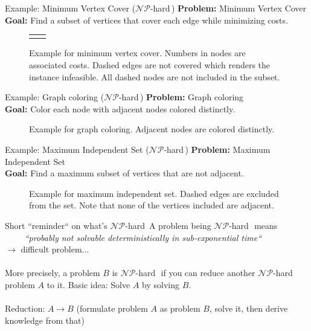 \documentclass[10pt]{beamer}
\newcommand{\primaryColorB}[1]{\textcolor{mpigreen}{\textbf{#1}}}
\newcommand{\q}[1]{``#1``}
\newcommand{\nphard}{$\mathcal{NP}$-hard\,}
\begin{document}
\begin{frame}{Example: Minimum Vertex Cover (\nphard)}
\primaryColorB{Problem:} Minimum Vertex Cover\\
\primaryColorB{Goal:} Find a subset of vertices that cover each edge while minimizing costs.\\

\begin{figure}
	\centering
\begin{tabular}{c c}
	\mvcSufficient
	\mvcInsufficient
\end{tabular}
	\caption{Example for minimum vertex cover. Numbers in nodes are associated costs. Dashed edges are not covered which renders the instance infeasible. All dashed nodes are not included in the subset.}
\end{figure}
\end{frame}


\begin{frame}{Example: Graph coloring (\nphard)}
\primaryColorB{Problem:} Graph coloring\\
\primaryColorB{Goal:} Color each node with adjacent nodes colored distinctly.\\

\begin{figure}
	\centering
	\scalebox{0.6}{\chromaticNumber}
	\caption{Example for graph coloring. Adjacent nodes are colored distinctly.}
\end{figure}
\end{frame}



\begin{frame}{Example: Maximum Independent Set (\nphard)}
\primaryColorB{Problem:} Maximum Independent Set\\
\primaryColorB{Goal:} Find a maximum subset of vertices that are not adjacent.\\

\begin{figure}
	\centering
	\scalebox{0.8}{\maxIndependentSet}
	\caption{Example for maximum independent set. Dashed edges are excluded from the set. Note that none of the vertices included are adjacent.}
\end{figure}
\end{frame}

\begin{frame}{Short \q{reminder} on what's \nphard}
A problem being \nphard\, means \\$\qquad$ \textit{\q{probably not solvable deterministically in sub-exponential time}}\\ $\rightarrow$ difficult problem...\\\,\\
More precisely, a problem $B$ is \nphard\, if you can reduce another \nphard problem $A$ to it. Basic idea: Solve $A$ by solving $B$.\\\,\\
Reduction: $A \rightarrow B$ (formulate problem $A$ as problem $B$, solve it, then derive knowledge from that)
\end{frame}
\end{document}
